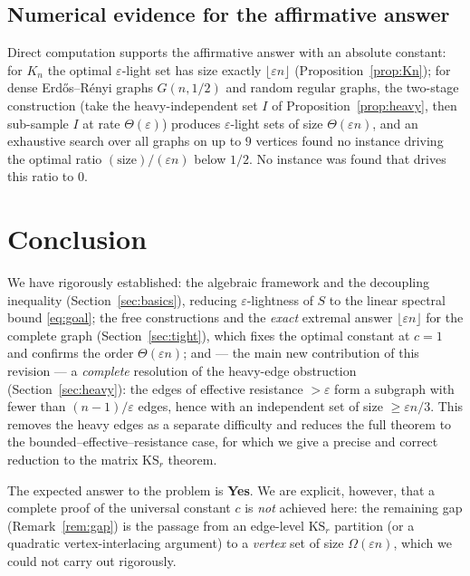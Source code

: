 \documentclass[12pt]{article}
\theoremstyle{definition}
\newcommand{\eps}{\varepsilon}
\begin{document}
\subsection*{Numerical evidence for the affirmative answer}

Direct computation supports the affirmative answer with an absolute constant: for $K_n$ the optimal
$\eps$-light set has size exactly $\lfloor\eps n\rfloor$ (Proposition~\ref{prop:Kn}); for dense
Erd\H{o}s--R\'enyi graphs $G(n,1/2)$ and random regular graphs, the two-stage construction (take the
heavy-independent set $I$ of Proposition~\ref{prop:heavy}, then sub-sample $I$ at rate $\Theta(\eps)$)
produces $\eps$-light sets of size $\Theta(\eps n)$, and an exhaustive search over all graphs on up to
$9$ vertices found no instance driving the optimal ratio $(\text{size})/(\eps n)$ below $1/2$. No
instance was found that drives this ratio to $0$.

\section{Conclusion}\label{sec:concl}

We have rigorously established: the algebraic framework and the decoupling inequality
(Section~\ref{sec:basics}), reducing $\eps$-lightness of $S$ to the linear spectral bound
\eqref{eq:goal}; the free constructions and the \emph{exact} extremal answer $\lfloor\eps n\rfloor$
for the complete graph (Section~\ref{sec:tight}), which fixes the optimal constant at $c=1$ and
confirms the order $\Theta(\eps n)$; and --- the main new contribution of this revision --- a
\emph{complete} resolution of the heavy-edge obstruction (Section~\ref{sec:heavy}): the edges of
effective resistance $>\eps$ form a subgraph with fewer than $(n-1)/\eps$ edges, hence with an
independent set of size $\ge\eps n/3$. This removes the heavy edges as a separate difficulty and
reduces the full theorem to the bounded--effective--resistance case, for which we give a precise and
correct reduction to the matrix $\mathrm{KS}_r$ theorem.

The expected answer to the problem is \textbf{Yes}. We are explicit, however, that a complete proof of
the universal constant $c$ is \emph{not} achieved here: the remaining gap (Remark~\ref{rem:gap}) is the
passage from an edge-level $\mathrm{KS}_r$ partition (or a quadratic vertex-interlacing argument) to a
\emph{vertex} set of size $\Omega(\eps n)$, which we could not carry out rigorously.
\end{document}
